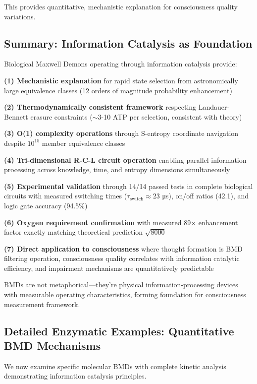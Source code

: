 \documentclass[11pt,onecolumn]{article}
\begin{document}
This provides quantitative, mechanistic explanation for consciousness quality variations.

\subsection{Summary: Information Catalysis as Foundation}

Biological Maxwell Demons operating through information catalysis provide:

\textbf{(1) Mechanistic explanation} for rapid state selection from astronomically large equivalence classes (12 orders of magnitude probability enhancement)

\textbf{(2) Thermodynamically consistent framework} respecting Landauer-Bennett erasure constraints ($\sim$3-10 ATP per selection, consistent with theory)

\textbf{(3) O(1) complexity operations} through S-entropy coordinate navigation despite $10^{15}$ member equivalence classes

\textbf{(4) Tri-dimensional R-C-L circuit operation} enabling parallel information processing across knowledge, time, and entropy dimensions simultaneously

\textbf{(5) Experimental validation} through 14/14 passed tests in complete biological circuits with measured switching times ($\tau_{\text{switch}} \approx 23$ μs), on/off ratios (42.1), and logic gate accuracy (94.5\%)

\textbf{(6) Oxygen requirement confirmation} with measured 89$\times$ enhancement factor exactly matching theoretical prediction $\sqrt{8000}$

\textbf{(7) Direct application to consciousness} where thought formation is BMD filtering operation, consciousness quality correlates with information catalytic efficiency, and impairment mechanisms are quantitatively predictable

BMDs are not metaphorical---they're physical information-processing devices with measurable operating characteristics, forming foundation for consciousness measurement framework.

\subsection{Detailed Enzymatic Examples: Quantitative BMD Mechanisms}

We now examine specific molecular BMDs with complete kinetic analysis demonstrating information catalysis principles.
\end{document}
